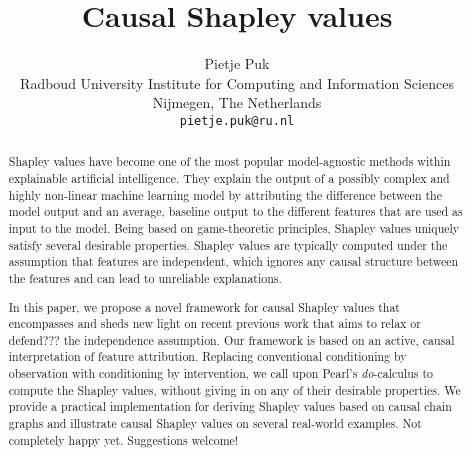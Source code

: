 \documentclass{article}
\title{Causal Shapley values}
\author{%
  Pietje Puk\\
  Radboud University
  Institute for Computing and Information Sciences\\
  Nijmegen, The Netherlands \\
  \texttt{pietje.puk@ru.nl} \\
}
\newcommand{\comment}[1]{{\color{red} #1}}
\begin{document}
\maketitle

\begin{abstract}
	Shapley values have become one of the most popular model-agnostic methods within explainable artificial intelligence. They explain the output of a possibly complex and highly non-linear machine learning model by attributing the difference between the model output and an average, baseline output to the different features that are used as input to the model. Being based on game-theoretic principles, Shapley values uniquely satisfy several desirable properties. Shapley values are typically computed under the assumption that features are independent, which ignores any causal structure between the features and can lead to unreliable explanations.
	
	In this paper, we propose a novel framework for causal Shapley values that encompasses and sheds new light on recent previous work that aims to relax \comment{or defend???} the independence assumption. Our framework is based on an active, causal interpretation of feature attribution. Replacing conventional conditioning by observation with conditioning by intervention, we call upon Pearl's \textit{do}-calculus to compute the Shapley values, without giving in on any of their desirable properties. We provide a practical implementation for deriving Shapley values based on causal chain graphs and illustrate causal Shapley values on several real-world examples.	\comment{Not completely happy yet. Suggestions welcome!}
\end{abstract}






\end{document}
